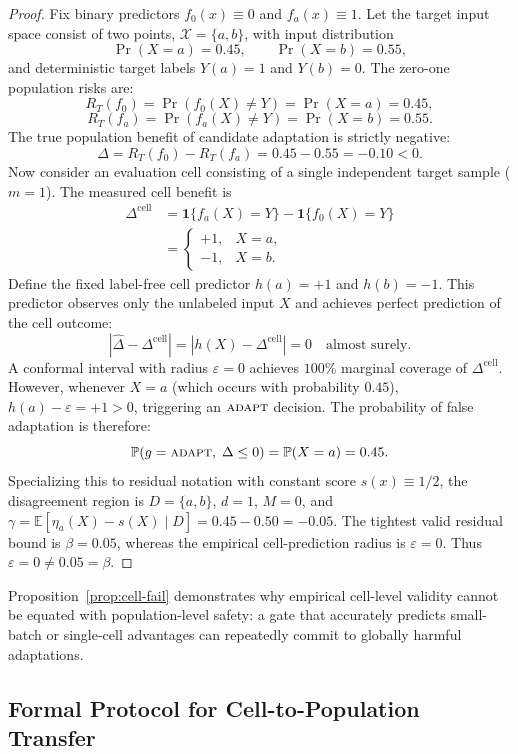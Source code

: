 \begin{proof}
Fix binary predictors $f_0(x) \equiv 0$ and $f_a(x) \equiv 1$. Let the target input space consist of two points,
$\mathcal X = \{a, b\}$, with input distribution
\[
 \Pr(X = a) = 0.45, \qquad \Pr(X = b) = 0.55,
\]
and deterministic target labels $Y(a) = 1$ and $Y(b) = 0$.
The zero-one population risks are:
\[
 R_T(f_0) = \Pr(f_0(X) \neq Y) = \Pr(X = a) = 0.45,
\]
\[
 R_T(f_a) = \Pr(f_a(X) \neq Y) = \Pr(X = b) = 0.55.
\]
The true population benefit of candidate adaptation is strictly negative:
\[
 \Delta = R_T(f_0) - R_T(f_a) = 0.45 - 0.55 = -0.10 < 0.
\]
Now consider an evaluation cell consisting of a single independent target sample ($m=1$).
The measured cell benefit is
\begin{align*}
 \Delta^{\mathrm{cell}} &= \mathbf 1\{f_a(X) = Y\} - \mathbf 1\{f_0(X) = Y\} \\
 &=
 \begin{cases}
 +1, & X = a, \\
 -1, & X = b.
 \end{cases}
\end{align*}
Define the fixed label-free cell predictor $h(a) = +1$ and $h(b) = -1$. This predictor observes only the
unlabeled input $X$ and achieves perfect prediction of the cell outcome:
\[
 |\widehat\Delta - \Delta^{\mathrm{cell}}| = |h(X) - \Delta^{\mathrm{cell}}| = 0 \quad \text{almost surely.}
\]
A conformal interval with radius $\varepsilon = 0$ achieves $100\%$ marginal coverage of $\Delta^{\mathrm{cell}}$.
However, whenever $X = a$ (which occurs with probability $0.45$), $h(a) - \varepsilon = +1 > 0$, triggering
an $\textnormal{\textsc{adapt}}$ decision. The probability of false adaptation is therefore:
\[
 \mathbb{P}(g = \textnormal{\textsc{adapt}}, \; \Delta \le 0) = \mathbb{P}(X = a) = 0.45.
\]
Specializing this to residual notation with constant score $s(x) \equiv 1/2$, the disagreement region is $D = \{a, b\}$,
$d = 1$, $M = 0$, and $\gamma = \mathbb E[\eta_a(X) - s(X) \mid D] = 0.45 - 0.50 = -0.05$.
The tightest valid residual bound is $\beta = 0.05$, whereas the empirical cell-prediction radius is $\varepsilon = 0$.
Thus $\varepsilon = 0 \neq 0.05 = \beta$.
\end{proof}

Proposition~\ref{prop:cell-fail} demonstrates why empirical cell-level validity cannot be equated with
population-level safety: a gate that accurately predicts small-batch or single-cell advantages can repeatedly
commit to globally harmful adaptations.

\subsection{Formal Protocol for Cell-to-Population Transfer}
\label{app:formal-transfer-protocol}

